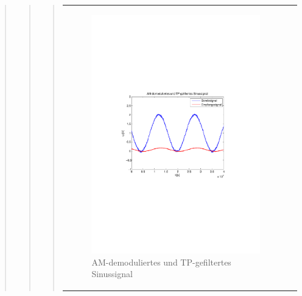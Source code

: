 \begin{quote}
\begin{quote}
\begin{quote}
\begin{center}
\begin{tabular}{ll}
                \hspace{-14em}
                    \begin{minipage}{0.6\textwidth}
    
                        \begin{figure}[H]
                            \label{fig:}
                            \includegraphics[scale=0.5, trim = 3cm 9cm 3.5cm
                            9.5cm, clip]{./Bilder/synchDemodFilter_sinus} %
                            \caption{AM-demoduliertes und
                            TP-gefiltertes Sinussignal}
                        \end{figure}
    
                    \end{minipage}
                    \begin{minipage}{0.6\textwidth}
    

\end{minipage}
\end{tabular}
\end{center}
\end{quote}
\end{quote}
\end{quote}
